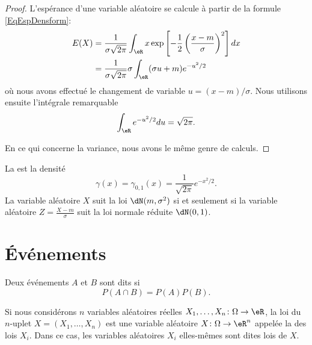 \begin{proof}
    L'espérance d'une variable aléatoire se calcule à partir de la formule \eqref{EqEspDensform}:
    \begin{subequations}
        \begin{align}
            E(X)&=\frac{1}{ \sigma\sqrt{2\pi} }\int_{\eR}x\exp\left[ -\frac{1}{ 2 }\left( \frac{ x-m }{ \sigma } \right)^2 \right]dx\\
            &=\frac{1}{ \sigma\sqrt{2\pi} }\sigma\int_{\eR}(\sigma u+m) e^{-u^2/2}
        \end{align}
    \end{subequations}
    où nous avons effectué le changement de variable \( u=(x-m)/\sigma\). Nous utilisons ensuite l'intégrale remarquable
    \begin{equation}
        \int_{\eR} e^{-u^2/2}du=\sqrt{2\pi}.
    \end{equation}

    En ce qui concerne la variance, nous avons le même genre de calculs.
\end{proof}

La  est la densité
\begin{equation}
    \gamma(x)=\gamma_{0,1}(x)=\frac{1}{ \sqrt{2\pi} } e^{-x^2/2}.
\end{equation}
La variable aléatoire \( X\) suit la loi \( \dN(m,\sigma^2)\) si et seulement si la variable aléatoire $Z=\frac{ X-m }{ \sigma }$ suit la loi normale réduite \( \dN(0,1)\).

\section{Événements}

\begin{definition}
    Deux événements \( A\) et \( B\) sont dits  si
    \begin{equation}
        P(A\cap B)=P(A)P(B).
    \end{equation}
\end{definition}
Si nous considérons \( n\) variables aléatoires réelles \( X_1,\ldots,X_n\colon\Omega\to\eR\), la loi du \( n\)-uplet \( X=(X_1,\ldots,X_n)\) est une variable aléatoire \( X\colon \Omega\to \eR^n\) appelée la  des lois \( X_i\). Dans ce cas, les variables aléatoires \( X_i\) elles-mêmes sont dites lois  de \( X\).

